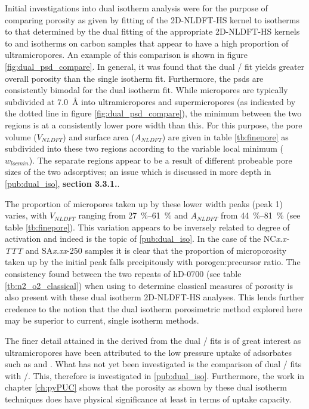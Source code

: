 Initial investigations into dual isotherm analysis were for the purpose of comparing porosity as given by fitting of the 2D-NLDFT-HS kernel to  isotherms to that determined by the dual fitting of the appropriate 2D-NLDFT-HS kernels to  and  isotherms on carbon samples that appear to have a high proportion of \glspl{ultramicropore}. An example of this comparison is shown in figure \ref{fig:dual_psd_compare}. In general, it was found that the dual / fit yields greater overall porosity than the single isotherm fit. Furthermore, the \acrshort{psd}s are consistently bimodal for the dual isotherm fit. While \glspl{micropore} are typically subdivided at \qty{7.0}{\angstrom} into \glspl{ultramicropore} and \glspl{supermicropore} (as indicated by the dotted line in figure \ref{fig:dual_psd_compare}), the minimum between the two regions is at a consistently lower pore width than this. For this purpose, the pore volume ($V_{NLDFT}$) and surface area ($A_{NLDFT}$) are given in table \ref{tb:finepore} as subdivided into these two regions according to the variable local minimum ($w_{locmin}$). The separate regions appear to be a result of different probeable pore sizes of the two adsorptives; an issue which is discussed in more depth in \ref{pub:dual_iso}, \textbf{section 3.3.1.}. 


The proportion of \glspl{micropore} taken up by these lower width peaks (peak 1) varies, with $V_{NLDFT}$ ranging from \qtyrange[list-units=single]{27}{61}{\percent} and $A_{NLDFT}$ from \qtyrange[list-units=single]{44}{81}{\percent} (see table \ref{tb:finepore}). This variation appears to be inversely related to degree of activation and indeed is the topic of \ref{pub:dual_iso}. In the case of the NC\textit{x.x-TTT} and SA\textit{x.xx}-250 samples it is clear that the proportion of microporosity taken up by the initial peak falls precipitously with \gls{porogen}:precursor ratio. The consistency found between the two repeats of hD-0700 (see table \ref{tb:n2_o2_classical}) when using  to determine classical measures of porosity is also present with these dual isotherm 2D-NLDFT-HS analyses. This lends further credence to the notion that the dual isotherm porosimetric method explored here may be superior to current, single isotherm methods.

The finer detail attained in the derived  from the dual / fits is of great interest as \glspl{ultramicropore} have been attributed to the low pressure uptake of \glspl{adsorbate} such as  and .\citep{Presser2011Effect, Sevilla2014Energy, Cabria2007optimum, DelaCasaLillo2002Hydrogen, Masika2012Hydrogen} What has not yet been investigated is the comparison of dual / fits with /. This, therefore is investigated in \ref{pub:dual_iso}. Furthermore, the work in chapter \ref{ch:pyPUC} shows that the porosity as shown by these dual isotherm techniques does have physical significance at least in terms of  uptake capacity.
%
\newpage
